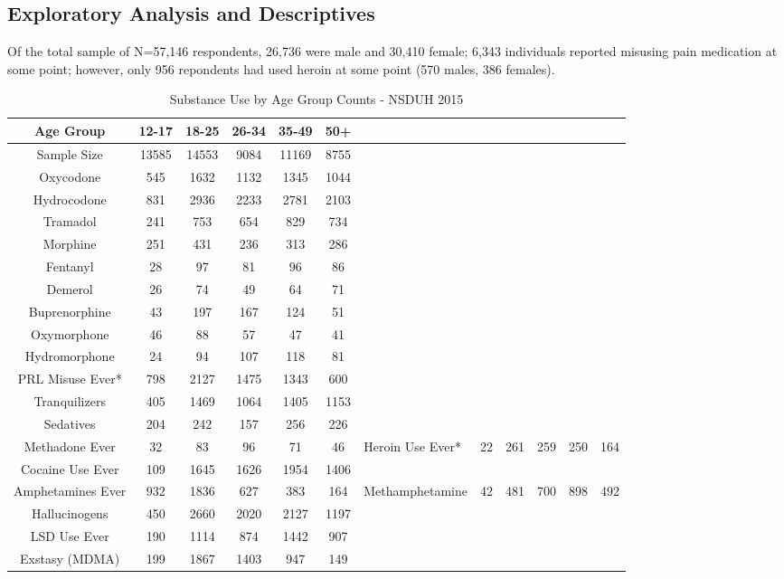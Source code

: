 \documentclass[sigconf]{acmart}
\begin{document}
\subsection{Exploratory Analysis and Descriptives}\cite{mckinney17}

Of the total sample of N=57,146 respondents, 26,736 were male and 30,410 female;
6,343 individuals reported misusing pain medication at some point; however, 
only 956 repondents had used heroin at some point (570 males, 386 females). 





\begin{table}
  \caption{Substance Use by Age Group Counts - NSDUH 2015
  \cite{samhsa16}}
  \label{tab:freq}
  \begin{tabular}{cccccc}
    \toprule
    Age Group & 12-17& 18-25& 26-34& 35-49& 50+\\
    \midrule
    Sample Size & 13585& 14553& 9084& 11169& 8755 \\
    \midrule
    Oxycodone& 545& 1632& 1132& 1345& 1044 \\
    Hydrocodone& 831& 2936& 2233& 2781& 2103 \\
    Tramadol& 241& 753& 654& 829& 734 \\
    Morphine& 251& 431& 236& 313& 286 \\
    Fentanyl& 28& 97& 81& 96& 86 \\
    Demerol& 26& 74& 49& 64& 71 \\
    Buprenorphine& 43& 197& 167& 124& 51 \\
    Oxymorphone& 46& 88& 57& 47& 41 \\
    Hydromorphone& 24& 94& 107& 118& 81 \\
    \midrule
    PRL Misuse Ever*& 798& 2127& 1475& 1343& 600 \\
    \midrule
    Tranquilizers& 405& 1469& 1064& 1405& 1153 \\
    Sedatives& 204& 242& 157& 256& 226 \\
    Methadone Ever& 32& 83& 96& 71& 46&
    \midrule
    Heroin Use Ever*& 22& 261& 259& 250& 164 \\
    \midrule
    Cocaine Use Ever& 109& 1645& 1626& 1954& 1406 \\
    Amphetamines Ever& 932& 1836& 627& 383& 164&
    Methamphetamine& 42& 481& 700&  898& 492 \\
    Hallucinogens& 450& 2660& 2020& 2127& 1197 \\
    LSD Use Ever& 190& 1114& 874& 1442& 907 \\
    Exstasy (MDMA)& 199& 1867& 1403& 947& 149 \\
    \bottomrule
  \end{tabular}
\end{table}
\end{document}
